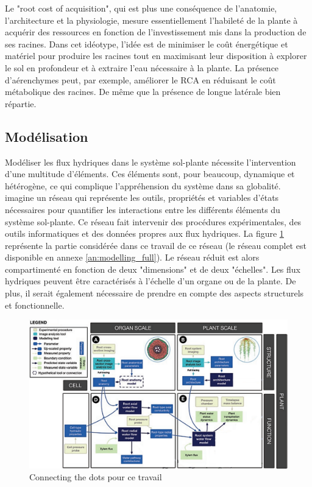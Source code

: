 Le "root cost of acquisition", qui est plus une conséquence de l'anatomie, l'architecture et la physiologie, mesure essentiellement l'habileté de la plante à acquérir des ressources en fonction de l'investissement mis dans la production de ses racines.
Dans cet idéotype, l'idée est de minimiser le coût énergétique et matériel pour produire les racines tout en maximisant leur disposition à explorer le sol en profondeur et à extraire l'eau nécessaire à la plante.
La présence d'aérenchymes peut, par exemple, améliorer le RCA en réduisant le coût métabolique des racines.
De même que la présence de longue latérale bien répartie.
\newline

\subsection{Modélisation}

Modéliser les flux hydriques dans le système sol-plante nécessite l'intervention d'une multitude d'éléments.
Ces éléments sont, pour beaucoup, dynamique et hétérogène, ce qui complique l'appréhension du système dans sa globalité.
\cite{passot_connecting_2018} imagine un réseau qui représente les outils, propriétés et variables d'états nécessaires pour quantifier les interactions entre les différents éléments du système sol-plante.
Ce réseau fait intervenir des procédures expérimentales, des outils informatiques et des données propres aux flux hydriques.
La figure \ref{fig:modelling} représente la partie considérée dans ce travail de ce réseau (le réseau complet est disponible en annexe \ref{an:modelling_full}).
Le réseau réduit est alors compartimenté en fonction de deux "dimensions" et de deux "échelles".
Les flux hydriques peuvent être caractérisés à l'échelle d'un organe ou de la plante.
De plus, il serait également nécessaire de prendre en compte des aspects structurels et fonctionnelle.
\newpage

\begin{figure}[ht]
\centering
\includegraphics[width=1\textwidth]{Image/modelling_b.png}
\caption{Connecting the dots pour ce travail \citep{passot_connecting_2018}}
\label{fig:modelling}
\end{figure}

